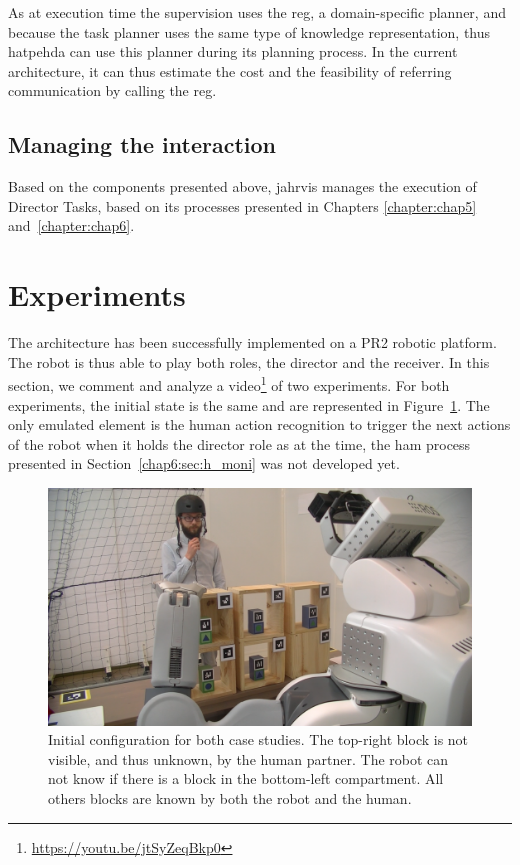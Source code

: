 \documentclass[a4paper,11pt,twoside]{StyleThese}
\begin{document}
As at execution time the supervision uses the \acrshort{reg}, a domain-specific planner, and because the task planner uses the same type of knowledge representation, thus \acrshort{hatpehda} can use this planner during its planning process. In the current architecture, it can thus estimate the cost and the feasibility of referring communication by calling the \acrshort{reg}.

\subsection{Managing the interaction}

Based on the components presented above, \acrshort{jahrvis} manages the execution of Director Tasks, based on its processes presented in Chapters \ref{chapter:chap5} and~\ref{chapter:chap6}.


\section{Experiments}

The architecture has been successfully implemented on a PR2 robotic platform. The robot is thus able to play both roles, the director and the receiver. In this section, we comment and analyze a video\footnote{\url{https://youtu.be/jtSyZeqBkp0}} of two experiments. For both experiments, the initial state is the same and are represented in Figure~\ref{chap9:fig:expe_config}. The only emulated element is the human action recognition to trigger the next actions of the robot when it holds the director role as at the time, the \acrfull{ham} process presented in Section~\ref{chap6:sec:h_moni} was not developed yet.

\begin{figure}[ht!]
	\centering
	\includegraphics[width=\textwidth]{figures/chapter4/expe/config.png}
	\caption{\label{chap9:fig:expe_config} Initial configuration for both case studies. The top-right block is not visible, and thus unknown, by the human partner. The robot can not know if there is a block in the bottom-left compartment. All others blocks are known by both the robot and the human.}
\end{figure}
\end{document}
